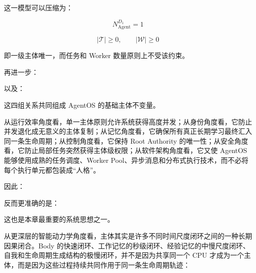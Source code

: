 这一模型可以压缩为：

\[
\boxed{
N_{\mathrm{Agent}}^{D_1}=1
}
\]

\[
\boxed{
|\mathcal T|\geq 0,
\qquad
|\mathcal W|\geq 0
}
\]

即一级主体唯一，而任务和 Worker 数量原则上不受该约束。

再进一步：

\begin{statementbox}
\centering
{}
\end{statementbox}

\begin{statementbox}
\centering
{}
\end{statementbox}

以及：

\begin{statementbox}
\centering
{}
\end{statementbox}

这四组关系共同组成 AgentOS 的基础主体不变量。

从运行效率角度看，单一主体原则允许系统获得高度并发；从身份角度看，它防止并发退化成无意义的主体复制；从记忆角度看，它确保所有真正长期学习最终汇入同一条生命周期；从控制角度看，它保持 Root Authority 的唯一性；从安全角度看，它防止局部任务突然获得主体级权限；从软件架构角度看，它又使 AgentOS 能够使用成熟的任务调度、Worker Pool、异步消息和分布式执行技术，而不必将每个执行单元都包装成“人格”。

因此：

\begin{statementbox}
\centering
{}
\end{statementbox}

反而更准确的是：

\begin{statementbox}
\centering
{}
\end{statementbox}

这也是本章最重要的系统思想之一。

从更深层的智能动力学角度看，主体其实是许多不同时间尺度闭环之间的一种长期因果闭合。Body 的快速闭环、工作记忆的秒级闭环、经验记忆的中慢尺度闭环、自我和生命周期生成结构的极慢闭环，并不是因为共享同一个 CPU 才成为一个主体，而是因为这些过程持续共同作用于同一条生命周期轨迹：

